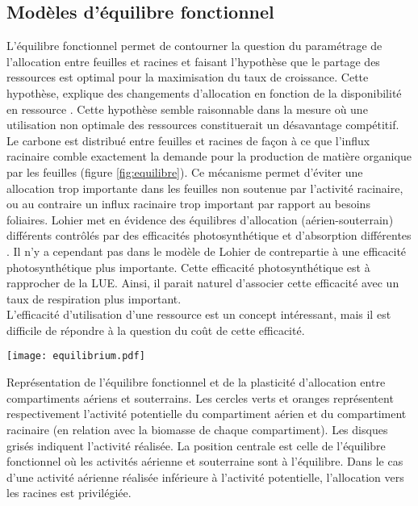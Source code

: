\documentclass[french]{article}
\begin{document}
{\subsection{Modèles d'équilibre fonctionnel}
L'équilibre fonctionnel permet de contourner la question du paramétrage de l'allocation entre feuilles et racines et faisant l'hypothèse que le partage des ressources est optimal pour la maximisation du taux de croissance. Cette hypothèse, explique des changements d'allocation en fonction de la disponibilité en ressource \cite{Osone2005}. Cette hypothèse semble raisonnable dans la mesure où une utilisation non optimale des ressources constituerait un désavantage compétitif. Le carbone est distribué entre feuilles et racines de façon à ce que l'influx racinaire comble exactement la demande pour la production de matière organique par les feuilles (figure \ref{fig:equilibre}). Ce mécanisme permet d'éviter une allocation trop importante dans les feuilles non soutenue par l'activité racinaire, ou au contraire un influx racinaire trop important par rapport au besoins foliaires. Lohier met en évidence des équilibres d'allocation (aérien-souterrain) différents contrôlés par des efficacités photosynthétique et d'absorption différentes \cite{Lohier2014}. Il n'y a cependant pas dans le modèle de Lohier de contrepartie à une efficacité photosynthétique plus importante. Cette efficacité photosynthétique est à rapprocher de la LUE. Ainsi, il parait naturel d'associer cette efficacité avec un taux de respiration plus important.\\
\indent L'efficacité d'utilisation d'une ressource est un concept intéressant, mais il est difficile de répondre à la question du coût de cette efficacité. \\

\begin{figure*}
\centering
\texttt{[image: equilibrium.pdf]}
\caption{Allocation plastique et l'équilibre fonctionnel.}
\label{fig:equilibre}
\footnotesize{Représentation de l'équilibre fonctionnel et de la plasticité d'allocation entre compartiments aériens et souterrains. Les cercles verts et oranges représentent respectivement l'activité potentielle du compartiment aérien et du compartiment racinaire (en relation avec la biomasse de chaque compartiment). Les disques grisés indiquent l'activité réalisée. La position centrale est celle de l'équilibre fonctionnel où les activités aérienne et souterraine sont à l'équilibre. Dans le cas d'une activité aérienne réalisée inférieure à l'activité potentielle, l'allocation vers les racines est privilégiée.}
\end{figure*}
  

}
\end{document}

